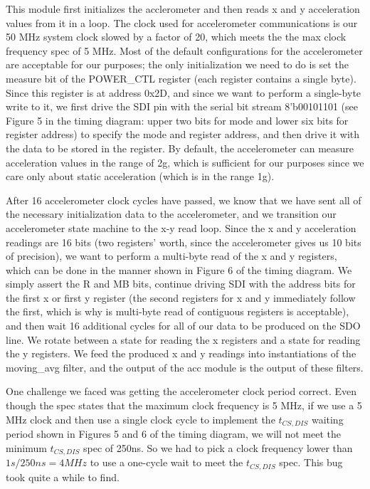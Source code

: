 \documentclass{article}
\begin{document}
This module first initializes the acclerometer and then reads x and y acceleration values from it in a loop. The clock used for accelerometer communications is our 50 MHz system clock slowed by a factor of 20, which meets the the max clock frequency spec of 5 MHz. Most of the default configurations for the accelerometer are acceptable for our purposes; the only initialization we need to do is set the measure bit of the POWER\_CTL register (each register contains a single byte). Since this register is at address 0x2D, and since we want to perform a single-byte write to it, we first drive the SDI pin with the serial bit stream 8'b00101101 (see Figure 5 in the timing diagram: upper two bits for mode and lower six bits for register address) to specify the mode and register address, and then drive it with the data to be stored in the register. By default, the accelerometer can measure acceleration values in the range of \pm 2g, which is sufficient for our purposes since we care only about static acceleration (which is in the range \pm 1g).

After 16 accelerometer clock cycles have passed, we know that we have sent all of the necessary initialization data to the accelerometer, and we transition our accelerometer state machine to the x-y read loop. Since the x and y acceleration readings are 16 bits (two registers' worth, since the accelerometer gives us 10 bits of precision), we want to perform a multi-byte read of the x and y registers, which can be done in the manner shown in Figure 6 of the timing diagram. We simply assert the R and MB bits, continue driving SDI with the address bits for the first x or first y register (the second registers for x and y immediately follow the first, which is why is multi-byte read of contiguous registers is acceptable), and then wait 16 additional cycles for all of our data to be produced on the SDO line. We rotate between a state for reading the x registers and a state for reading the y registers. We feed the produced x and y readings into instantiations of the moving\_avg filter, and the output of the acc module is the output of these filters.

One challenge we faced was getting the accelerometer clock period correct. Even though the spec states that the maximum clock frequency is 5 MHz, if we use a 5 MHz clock and then use a single clock cycle to implement the $t_{CS,DIS}$ waiting period shown in Figures 5 and 6 of the timing diagram, we will not meet the minimum $t_{CS,DIS}$ spec of 250ns. So we had to pick a clock frequency lower than $1s/250ns = 4 MHz$ to use a one-cycle wait to meet the $t_{CS,DIS}$ spec. This bug took quite a while to find.
\end{document}
